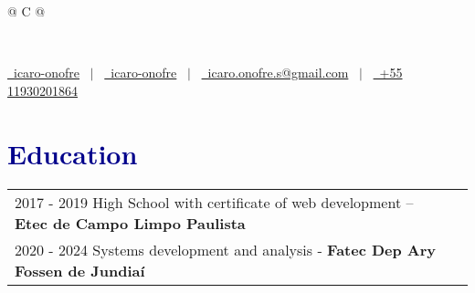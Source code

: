\documentclass[a4paper,12pt]{article}
\begin{document}
\pagestyle{empty} 



\begin{tabularx}{\linewidth}{@{} C @{}}
\begin{flushleft}
	\fontsize{30}{60} \\[10pt]
\end{flushleft}
\color{black}
\href{https://github.com/icaro-onofre}{\raisebox{-0.05\height}\faGithub\ icaro-onofre} \ $|$ \ 
\href{https://linkedin.com/in/icaro-onofre}{\raisebox{-0.05\height}\faLinkedin\ icaro-onofre} \ $|$ \ 
\href{mailto:icaro.onofre.s@gmail.com}{\raisebox{-0.05\height}\faEnvelope \ icaro.onofre.s@gmail.com} \ $|$ \ 
\href{tel:+11930201864}{\raisebox{-0.05\height}\faMobile \ +55 11930201864} \\
\end{tabularx}
\section{{\textcolor{darkblue}{\textbf{Education}}}}
\begin{tabularx}{\linewidth}{@{}l X@{}}	

2017 - 2019 High School with certificate of web development –\textbf{Etec de Campo Limpo Paulista} \\

2020 - 2024 Systems development and analysis - \textbf{Fatec Dep Ary Fossen de Jundiaí} \\

\end{tabularx}
\end{document}
